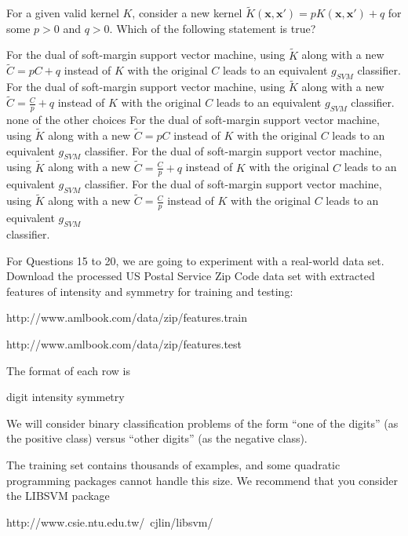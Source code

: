 \documentclass[a4paper,10pt]{exam}
\begin{document}
\begin{questions}
   \question For a given valid kernel $K$, consider a new kernel $\tilde{K}(\mathbf{x}, \mathbf{x}') = p K(\mathbf{x}, \mathbf{x}') + q$ for some $p>0$ and $q>0$. Which of the following statement is true?
  \begin{checkboxes}
  	\choice For the dual of soft-margin support vector machine, using $\tilde{K}$ along with a new $\tilde{C} = pC + q$ instead of $K$ with the original $C$ leads to an equivalent $g_{SVM}$ classifier.
  	\choice For the dual of soft-margin support vector machine, using $\tilde{K}$ along with a new $\tilde{C} = \frac{C}{p} + q$ instead of $K$ with the original $C$ leads to an equivalent $g_{SVM}$ classifier.
  	\choice none of the other choices
    \choice For the dual of soft-margin support vector machine, using $\tilde{K}$ along with a new $\tilde{C} = pC$ instead of $K$ with the original $C$ leads to an equivalent $g_{SVM}$ classifier.
   	\choice For the dual of soft-margin support vector machine, using $\tilde{K}$ along with a new $\tilde{C} = \frac{C}{p} + q$ instead of $K$ with the original $C$ leads to an equivalent $g_{SVM}$ classifier.
  	\CorrectChoice For the dual of soft-margin support vector machine, using $\tilde{K}$ along with a new $\tilde{C} = \frac{C}{p}$ instead of $K$ with the original $C$ leads to an equivalent $g_{SVM}$\\ classifier.
  \end{checkboxes}
  
  \question For Questions 15 to 20, we are going to experiment with a real-world data set. Download the processed US Postal Service Zip Code data set with extracted features of intensity and symmetry for training and testing:
  
  http://www.amlbook.com/data/zip/features.train
  
  http://www.amlbook.com/data/zip/features.test
  
  The format of each row is
  
  digit intensity symmetry 
  
  We will consider binary classification problems of the form ``one of the digits'' (as the positive class) versus ``other digits'' (as the negative class).
  
  The training set contains thousands of examples, and some quadratic programming packages cannot handle this size. We recommend that you consider the LIBSVM package
  
  http://www.csie.ntu.edu.tw/~cjlin/libsvm/
  

\end{questions}
\end{document}
